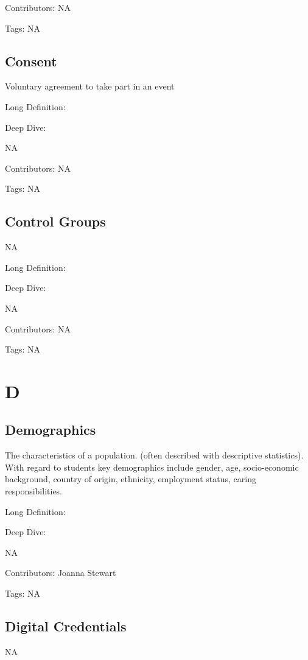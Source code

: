 \documentclass[
  letterpaper,
  DIV=11,
  numbers=noendperiod]{scrreprt}
\begin{document}
Contributors: NA

Tags: NA

\section{Consent}\label{consent}

Voluntary agreement to take part in an event

Long Definition:

Deep Dive:

NA

Contributors: NA

Tags: NA

\section{Control Groups}\label{control-groups}

NA

Long Definition:

Deep Dive:

NA

Contributors: NA

Tags: NA


\chapter{D}\label{d}

\section{Demographics}\label{demographics}

The characteristics of a population. (often described with descriptive
statistics). With regard to students key demographics include gender,
age, socio-economic background, country of origin, ethnicity, employment
status, caring responsibilities.

Long Definition:

Deep Dive:

NA

Contributors: Joanna Stewart

Tags: NA

\section{Digital Credentials}\label{digital-credentials}

NA
\end{document}
